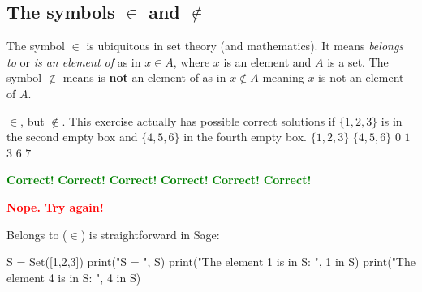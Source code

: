 \documentclass{article}
\newcommand{\red}[1]{\textcolor{red}{\textbf{#1}}}
\newcommand{\green}[1]{\textcolor{green}{\textbf{#1}}}
\begin{document}
\subsection{The symbols $\in$ and $\notin$}

The symbol $\in$ is ubiquitous in set theory (and mathematics). 
It means \emph{belongs to} or \emph{is an element of} as in 
$x\in A$, where $x$ is an element and $A$ is a set. The symbol
$\notin$ means is \textbf{not} an element of as in
$x\notin A$ meaning $x$ is not an element of $A$.


\begin{quizexercise}[showhide]
\begin{paraquiz}
  \question
  \box$\in$\box, but \box$\not\in$\box. This exercise actually has \box possible correct solutions
if $\{1, 2, 3\}$ is in the second empty box and $\{4, 5, 6\}$ in the fourth empty box.
  \answer
  $\{1, 2, 3\}$
  \answer
  $\{4, 5, 6\}$
  \answer
  $0$
  \answer
  $1$
  \answer
  $3$
  \answer
  $6$
  \answer
  $7$

  \green{Correct!}
  \green{Correct!}
  \green{Correct!}
  \green{Correct!}
  \green{Correct!}
  \green{Correct!}

  \red{Nope. Try again!}
\end{paraquiz}
\end{quizexercise}


Belongs to ($\in$) is straightforward in Sage:

\begin{code}
S = Set([1,2,3])
print("S = ", S)
print("The element 1 is in S: ", 1 in S)
print("The element 4 is in S: ", 4 in S)
\end{code}



\end{document}
